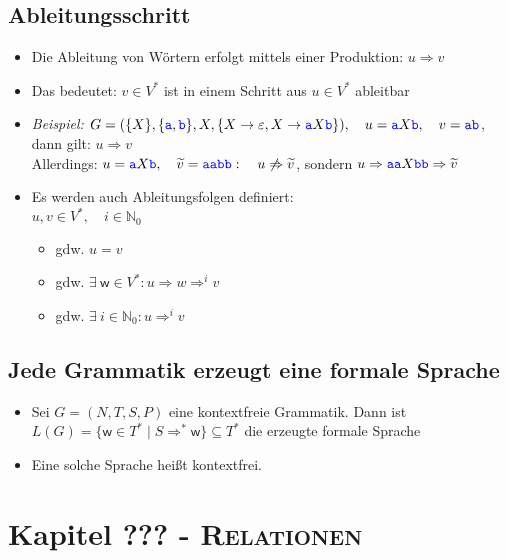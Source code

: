 \documentclass{article}
\newcommand{\Nz}{{\mathbb{N}_0}} %
\newcommand{\kapitel}[2]{Kapitel #1 - \textsc{#2}}
\newcommand{\blue}[1]{\textcolor{blue}{#1}}
\newcommand{\important}[1]{\textcolor{importantColor}{#1}}
\newcommand{\example}[1]{\textit{Beispiel: }#1}
\newcommand{\word}[1]{\blue{\texttt{#1}}}
\newcommand{\set}[1]{\{#1\}}
\newcommand{\w}{\textsf{w}}
\begin{document}
\subsection{Ableitungsschritt}
\begin{itemize}
    \item Die Ableitung von Wörtern erfolgt mittels einer \important{Produktion}: \important{$u\Rightarrow v$}
    \item Das bedeutet: $v\in V^*$ ist in einem Schritt aus $u\in V^*$ ableitbar
    \item \example{$G=(\set{X}, \set{\word{a},\word{b}}, X, \set{X\rightarrow\varepsilon, X\rightarrow\word{a}X\word{b}}), \quad u=\word{a}X\word{b},\quad v=\word{ab}$, dann gilt: $u\Rightarrow v$\\
    Allerdings: ${u} = \word{a}X\word{b},\quad \widetilde{v}=\word{aabb}:\quad u\not\Rightarrow \widetilde{v}$, sondern $u\Rightarrow \word{aa}X\word{bb} \Rightarrow \widetilde{v}$}
    \item Es werden auch \important{Ableitungsfolgen definiert}:\\$u,v\in V^*, \quad i\in \Nz$
    \begin{itemize}
        \item \makebox[1.5cm][l]{\important{$u\Rightarrow^0v$}} gdw. $u=v$
        \item \makebox[1.5cm][l]{\important{$u\Rightarrow^{i+1}v$}} gdw. $\exists\: \w \in V^*: u\Rightarrow w\Rightarrow^iv$
        \item \makebox[1.5cm][l]{\important{$u\Rightarrow^*v$}} gdw. $\exists\: i\in \Nz: u\Rightarrow^iv$
    \end{itemize}
\end{itemize}
\subsection{Jede Grammatik erzeugt eine formale Sprache}
\begin{itemize}
    \item Sei $G=(N,T,S,P)$ eine kontextfreie Grammatik. Dann ist\\
    $L(G)=\set{\w\in T^* \mid S \Rightarrow^* \w} \subseteq T^*$ die \important{erzeugte formale Sprache}
    \item Eine solche Sprache heißt \important{kontextfrei}.
\end{itemize}

\newpage
\section{\kapitel{???}{Relationen}}
\end{document}
